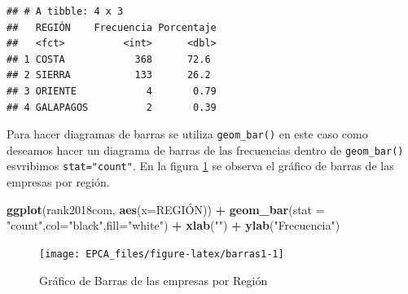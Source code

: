 \documentclass[
]{krantz}
\makeatletter
\newenvironment{Shaded}{\begin{snugshade}}{\end{snugshade}}
\newcommand{\DataTypeTok}[1]{\textcolor[rgb]{0.27,0.27,0.27}{#1}}
\newcommand{\DecValTok}[1]{\textcolor[rgb]{0.06,0.06,0.06}{#1}}
\newcommand{\KeywordTok}[1]{\textcolor[rgb]{0.27,0.27,0.27}{\textbf{#1}}}
\newcommand{\NormalTok}[1]{#1}
\newcommand{\OperatorTok}[1]{\textcolor[rgb]{0.43,0.43,0.43}{\textbf{#1}}}
\newcommand{\StringTok}[1]{\textcolor[rgb]{0.5,0.5,0.5}{#1}}
\newenvironment{kframe}{%
\medskip{}
\setlength{\fboxsep}{.8em}
 \def\at@end@of@kframe{}%
 \ifinner\ifhmode%
  \def\at@end@of@kframe{\end{minipage}}%
  \begin{minipage}{\columnwidth}%
 \fi\fi%
 \def\FrameCommand##1{\hskip\@totalleftmargin \hskip-\fboxsep
 \colorbox{shadecolor}{##1}\hskip-\fboxsep
     \hskip-\linewidth \hskip-\@totalleftmargin \hskip\columnwidth}%
 \MakeFramed {\advance\hsize-\width
   \@totalleftmargin\z@ \linewidth\hsize
   \@setminipage}}%
 {\par\unskip\endMakeFramed%
 \at@end@of@kframe}
\renewenvironment{Shaded}{\begin{kframe}}{\end{kframe}}
\makeatother
\begin{document}
\begin{Shaded}
\end{Shaded}

\begin{verbatim}
## # A tibble: 4 x 3
##   REGIÓN    Frecuencia Porcentaje
##   <fct>          <int>      <dbl>
## 1 COSTA            368      72.6 
## 2 SIERRA           133      26.2 
## 3 ORIENTE            4       0.79
## 4 GALAPAGOS          2       0.39
\end{verbatim}

Para hacer diagramas de barras se utiliza \texttt{geom\_bar()} en este caso como deseamos hacer un diagrama de barras de las frecuencias dentro de \texttt{geom\_bar()} esvribimos \texttt{stat="count"}. En la figura \ref{fig:barras1} se observa el gráfico de barras de las empresas por región.

\begin{Shaded}
\begin{Highlighting}[]
\KeywordTok{ggplot}\NormalTok{(rank2018com, }\KeywordTok{aes}\NormalTok{(}\DataTypeTok{x=}\NormalTok{REGIÓN)) }\OperatorTok{+}\StringTok{ }
\StringTok{  }\KeywordTok{geom_bar}\NormalTok{(}\DataTypeTok{stat =} \StringTok{"count"}\NormalTok{,}\DataTypeTok{col=}\StringTok{"black"}\NormalTok{,}\DataTypeTok{fill=}\StringTok{"white"}\NormalTok{) }\OperatorTok{+}
\StringTok{  }\KeywordTok{xlab}\NormalTok{(}\StringTok{""}\NormalTok{) }\OperatorTok{+}\StringTok{ }\KeywordTok{ylab}\NormalTok{(}\StringTok{"Frecuencia"}\NormalTok{)}
\end{Highlighting}
\end{Shaded}

\begin{figure}[h!]

{\centering \texttt{[image: EPCA\_files/figure-latex/barras1-1]} 

}

\caption{Gráfico de Barras de las empresas por Región}\label{fig:barras1}
\end{figure}
\end{document}
